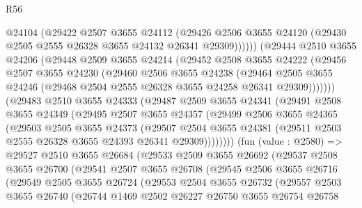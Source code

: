 \begin{lexlean}{R56}
\begin{coremodule}
              @24104
              (@29422
                @2507
                @3655
                @24112
                (@29426
                  @2506
                  @3655
                  @24120
                  (@29430 @2505 @2555 @26328 @3655 @24132 @26341 @29309))))))
        (@29444
          @2510
          @3655
          @24206
          (@29448
            @2509
            @3655
            @24214
            (@29452
              @2508
              @3655
              @24222
              (@29456
                @2507
                @3655
                @24230
                (@29460
                  @2506
                  @3655
                  @24238
                  (@29464
                    @2505
                    @3655
                    @24246
                    (@29468 @2504 @2555 @26328 @3655 @24258 @26341 @29309)))))))
        (@29483
          @2510
          @3655
          @24333
          (@29487
            @2509
            @3655
            @24341
            (@29491
              @2508
              @3655
              @24349
              (@29495
                @2507
                @3655
                @24357
                (@29499
                  @2506
                  @3655
                  @24365
                  (@29503
                    @2505
                    @3655
                    @24373
                    (@29507
                      @2504
                      @3655
                      @24381
                      (@29511 @2503 @2555 @26328 @3655 @24393 @26341 @29309))))))))
        (fun (value : @2580) =>
        @29527
          @2510
          @3655
          @26684
          (@29533
            @2509
            @3655
            @26692
            (@29537
              @2508
              @3655
              @26700
              (@29541
                @2507
                @3655
                @26708
                (@29545
                  @2506
                  @3655
                  @26716
                  (@29549
                    @2505
                    @3655
                    @26724
                    (@29553
                      @2504
                      @3655
                      @26732
                      (@29557
                        @2503
                        @3655
                        @26740
                        (@26744
                          @1469
                          @2502
                          @26227
                          @26750
                          @3655
                          @26754
                          @26758

\end{coremodule}
\end{lexlean}
